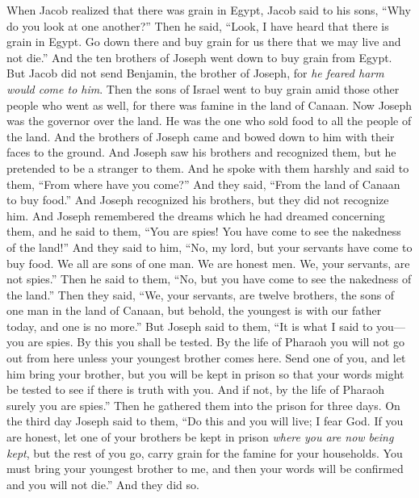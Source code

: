 \begin{biblechapter} %
 When Jacob realized that there was grain in Egypt, Jacob said to his sons, “Why do you look at one another?”
\verse Then he said, “Look, I have heard that there is grain in Egypt. Go down there and buy grain for us there that we may live and not die.”
\verse And the ten brothers of Joseph went down to buy grain from Egypt.
\verse But Jacob did not send Benjamin, the brother of Joseph, for \textit{he feared harm would come to him}.
\verse Then the sons of Israel went to buy grain amid those other people who went as well, for there was famine in the land of Canaan.
\verse Now Joseph was the governor over the land. He was the one who sold food to all the people of the land. And the brothers of Joseph came and bowed down to him with their faces to the ground.
\verse And Joseph saw his brothers and recognized them, but he pretended to be a stranger to them. And he spoke with them harshly and said to them, “From where have you come?” And they said, “From the land of Canaan to buy food.”
\verse And Joseph recognized his brothers, but they did not recognize him.
\verse And Joseph remembered the dreams which he had dreamed concerning them, and he said to them, “You are spies! You have come to see the nakedness of the land!”
\verse And they said to him, “No, my lord, but your servants have come to buy food.
\verse We all are sons of one man. We are honest men. We, your servants, are not spies.”
\verse Then he said to them, “No, but you have come to see the nakedness of the land.”
\verse Then they said, “We, your servants, are twelve brothers, the sons of one man in the land of Canaan, but behold, the youngest is with our father today, and one is no more.”
\verse But Joseph said to them, “It is what I said to you—you are spies.
\verse By this you shall be tested. By the life of Pharaoh you will not go out from here unless your youngest brother comes here.
\verse Send one of you, and let him bring your brother, but you will be kept in prison so that your words might be tested to see if there is truth with you. And if not, by the life of Pharaoh surely you are spies.”
\verse Then he gathered them into the prison for three days.
\verse On the third day Joseph said to them, “Do this and you will live; I fear God.
\verse If you are honest, let one of your brothers be kept in prison \textit{where you are now being kept}, but the rest of you go, carry grain for the famine for your households.
\verse You must bring your youngest brother to me, and then your words will be confirmed and you will not die.” And they did so.

\end{biblechapter}
